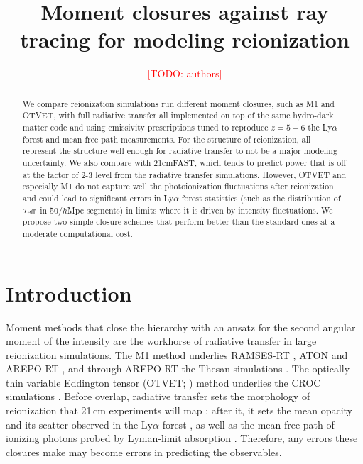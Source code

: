 \documentclass[iop]{openjournal}
\newcommand{\todo}[1]{\textcolor{red}{[TODO: #1]}}
\begin{document}
\title{Moment closures against ray tracing for modeling reionization}
\author{\todo{authors}}
\affiliation{\todo{affiliations}}

\begin{abstract}
We compare reionization simulations run different moment closures, such as M1 and OTVET, with full radiative transfer all implemented on top of the same hydro-dark matter code and using emissivity prescriptions tuned to reproduce $z=5-6$ the Ly$\alpha$ forest and mean free path measurements.  For the structure of reionization, all represent the structure well enough for radiative transfer to not be a major modeling uncertainty.  We also compare with 21cmFAST, which tends to predict power that is off at the factor of 2-3 level from the radiative transfer simulations.  However, OTVET and especially M1 do not capture well the photoionization fluctuations after reionization and could lead to significant errors in Ly$\alpha$ forest statistics (such as the distribution of $\tau_{\rm eff}$ in $50/h$Mpc segments) in limits where it is driven by intensity fluctuations. We propose two simple closure schemes that perform better than the standard ones at a moderate computational cost. 
\end{abstract}
\keywords{\todo{keywords from the Unified Astronomy Thesaurus}}

\maketitle

\section{Introduction}
Moment methods that close the hierarchy with an ansatz for the second angular moment of the intensity are the workhorse of radiative transfer in large reionization
simulations. The M1 method underlies RAMSES-RT \citep{rosdahl13}, ATON
\citep{aubert08} and AREPO-RT \citep{kannan19}, and through AREPO-RT the
Thesan simulations \citep{kannan22}. The optically thin variable Eddington
tensor (OTVET; \citealt{gnedin01}) method underlies the CROC simulations
\citep{gnedin14}. Before overlap, radiative transfer sets the morphology of reionization that
21\,cm experiments will map \citep{Furlanetto2006}; after it, it sets the mean opacity and its scatter observed in the Ly$\alpha$ forest \citep{davies16,davies17}, as well as the mean free path of ionizing photons probed by Lyman-limit absorption \citep{becker21,zhu23}. Therefore, any errors these closures make may become errors in predicting the observables.
\end{document}
